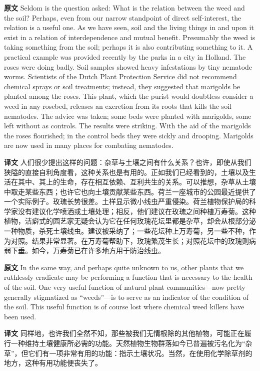 \documentclass[UTF8,zihao=-4]{ctexart}
\begin{document}
\noindent\textbf{原文} Seldom is the question asked: What is the relation between the weed and the soil? Perhaps, even from our narrow standpoint of direct self-interest, the relation is a useful one. As we have seen, soil and the living things in and upon it exist in a relation of interdependence and mutual benefit. Presumably the weed is taking something from the soil; perhaps it is also contributing something to it. A practical example was provided recently by the parks in a city in Holland. The roses were doing badly. Soil samples showed heavy infestations by tiny nematode worms. Scientists of the Dutch Plant Protection Service did not recommend chemical sprays or soil treatments; instead, they suggested that marigolds be planted among the roses. This plant, which the purist would doubtless consider a weed in any rosebed, releases an excretion from its roots that kills the soil nematodes. The advice was taken; some beds were planted with marigolds, some left without as controls. The results were striking. With the aid of the marigolds the roses flourished; in the control beds they were sickly and drooping. Marigolds are now used in many places for combating nematodes.
\par
\noindent\textbf{译文} 人们很少提出这样的问题：杂草与土壤之间有什么关系？也许，即使从我们狭隘的直接自利角度看，这种关系也是有用的。正如我们已经看到的，土壤以及生活在其中、其上的生命，存在相互依赖、互利共生的关系。可以推想，杂草从土壤中取走某些东西；也许它也向土壤贡献某些东西。荷兰一座城市的公园最近提供了一个实际例子。玫瑰长势很差。土样显示微小线虫严重侵染。荷兰植物保护局的科学家没有建议化学喷洒或土壤处理；相反，他们建议在玫瑰之间种植万寿菊。这种植物，洁癖式的园艺家无疑会认为它在任何玫瑰花坛里都是杂草，却会从根部分泌一种物质，杀死土壤线虫。建议被采纳了；一些花坛种上万寿菊，另一些不种，作为对照。结果非常显著。在万寿菊帮助下，玫瑰繁茂生长；对照花坛中的玫瑰则病弱下垂。如今，万寿菊已在许多地方用于防治线虫。
\par\medskip

\noindent\textbf{原文} In the same way, and perhaps quite unknown to us, other plants that we ruthlessly eradicate may be performing a function that is necessary to the health of the soil. One very useful function of natural plant communities---now pretty generally stigmatized as ``weeds''---is to serve as an indicator of the condition of the soil. This useful function is of course lost where chemical weed killers have been used.
\par
\noindent\textbf{译文} 同样地，也许我们全然不知，那些被我们无情根除的其他植物，可能正在履行一种维持土壤健康所必需的功能。天然植物生物群落如今已普遍被污名化为“杂草”，但它们有一项非常有用的功能：指示土壤状况。当然，在使用化学除草剂的地方，这种有用功能便丧失了。
\par\medskip
\end{document}
